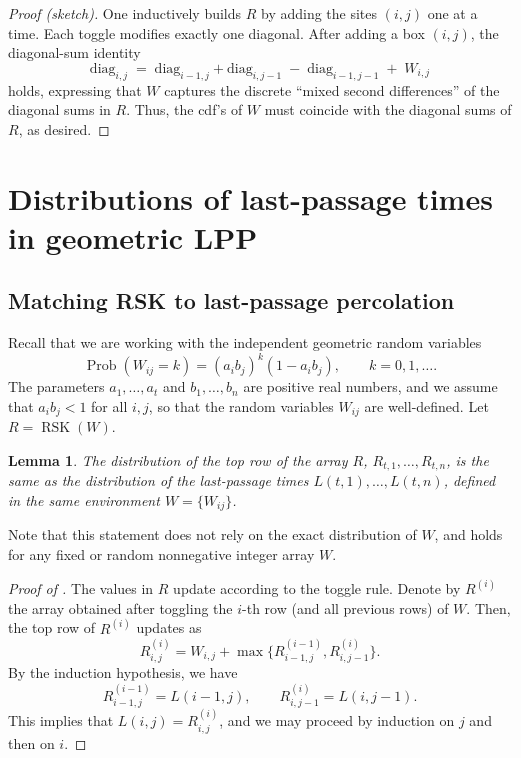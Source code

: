 \documentclass[letterpaper,11pt,oneside,reqno]{article}
\numberwithin{equation}{section}
\newtheorem{lemma}[proposition]{Lemma}
\theoremstyle{definition}
\begin{document}
\begin{proof}[Proof (sketch)]
	One inductively builds $R$ by adding the sites $(i,j)$ one at a time.  Each toggle modifies exactly one diagonal.
	After adding a box $(i,j)$, the diagonal-sum identity
\[
\mathrm{diag}_{i,j}
\;=\;
\mathrm{diag}_{i-1,j} + \mathrm{diag}_{i,j-1}
\;-\;
\mathrm{diag}_{i-1,j-1}
\;+\;
W_{i,j}
\]
holds, expressing that $W$ captures the discrete ``mixed second differences'' of the diagonal sums in $R$.
Thus, the cdf's of $W$ must coincide with the diagonal sums of $R$, as desired.
\end{proof}

\section{Distributions of last-passage times in geometric LPP}
\label{sec:distributions_geometric_LPP}

\subsection{Matching RSK to last-passage percolation}

Recall that we are working with the independent geometric random variables
\begin{equation*}
	\operatorname{Prob}\left( W_{ij}=k \right)=(a_ib_j)^k(1-a_ib_j),\qquad k=0,1,\ldots.
\end{equation*}
The parameters $a_1,\ldots,a_t $ and $b_1,\ldots,b_n$ are positive real numbers, and we assume that $a_i b_j<1$ for all $i,j$,
so that the random variables $W_{ij}$ are well-defined.
Let $R=\operatorname{RSK}(W)$.
\begin{lemma}
	\label{lemma:L_as_R}
	The distribution of the top row of the array $R$,
	$R_{t,1},\ldots,R_{t,n}$,
	is the same as the distribution of the last-passage times
	$L(t,1),\ldots,L(t,n)$, defined in the same environment $W=\{W_{ij}\}$.
\end{lemma}
Note that this statement does not rely on the exact distribution of $W$,
and holds for any fixed or random nonnegative integer array $W$.
\begin{proof}[Proof of ]
	The values in $R$ update according to the toggle rule.
	Denote by $R^{(i)}$ the array obtained after toggling the $i$-th row (and all previous rows) of $W$.
	Then, the top row of $R^{(i)}$ updates as
	\begin{equation*}
		R^{(i)}_{i,j}=
		W_{i,j}+\max\big\{R^{(i-1)}_{i-1,j},
		R^{(i)}_{i,j-1}\big\}.
	\end{equation*}
	By the induction hypothesis, we have
	\begin{equation*}
		R^{(i-1)}_{i-1,j}=L(i-1,j),\qquad R^{(i)}_{i,j-1}=L(i,j-1).
	\end{equation*}
	This implies that $L(i,j)=R^{(i)}_{i,j}$,
	and we may proceed by induction on $j$ and then on $i$.
\end{proof}
\end{document}
